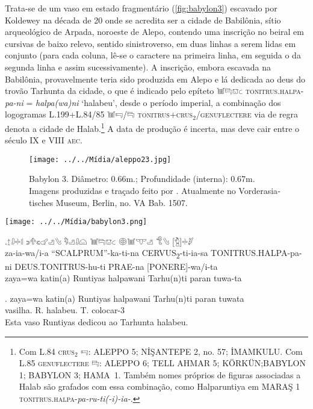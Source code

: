 Trata-se de um vaso em estado fragmentário (\autoref{fig:babylon3}) escavado por
Koldewey na década de 20 onde se acredita ser a cidade de Babilônia, sítio
arqueológico de Arpada, noroeste de Alepo, contendo uma inscrição no
beiral em cursivas de baixo relevo, sentido sinistroverso, em duas linhas a
serem lidas em conjunto (para cada coluna, lê-se o caractere na primeira linha,
em seguida o da segunda linha e assim sucessivamente).
A inscrição, embora escavada na Babilônia, provavelmente teria sido
produzida em Alepo e lá dedicada ao deus do trovão Tarhunta da cidade, o que é
indicado pelo epíteto 𔓢𔑞𔕸𔗐 \textsc{tonitrus.halpa}-\textit{pa-ni}
= \textit{halpa{(wa)}ni} `halabeu', desde o período imperial,
a combinação dos logogramas L.199+L.84\slash{}85 𔓢𔑝\slash{}𔑞
\textsc{tonitrus+crus$_2$\slash{}genuflectere} 
via de regra denota a cidade de Halab.\footnote{Com L.84
	\textsc{crus}$_2$ 𔑝: ALEPPO 5; NİŞANTEPE 2, no. 57; İMAMKULU.\@
	Com L.85 \textsc{genuflectere} 𔑞:  ALEPPO 6; TELL AHMAR 5;
	KÖRKÜN;\@ BABYLON 1; BABYLON 3; \mbox{HAMA 1}.\@
 Também nomes próprios de figuras associadas a Halab são grafados com essa
 combinação, como Halparuntiya em 
 MARAŞ 1 \textsc{tonitrus.halpa}-\textit{pa-ru-ti{(-i)}-ia-}.
}
A data de produção é incerta, mas deve cair entre o século IX e VIII
\textsc{aec}.

\begin{figure}[!htb]
	\texttt{[image: ../../Mídia/aleppo23.jpg]}
		\caption{
			Babylon 3. Diâmetro: 0.66m.; Profundidade 
			(interna): 0.67m. Imagens produzidas e traçado feito por 
			\citet[\emph{plate} 212]{CHLI13}. Atualmente no 
			\foreignlanguage{german}{Vorderasiatisches Museum}, Berlin, 
			no. VA Bab. 1507.
		}\label{fig:babylon3}
\end{figure}

	\begin{center}
		\texttt{[image: ../../Mídia/babylon3.png]}
	\end{center}
\exg.{\Large 𔖪𔓱𔗬𔗷} {\Large 𔗎𔔯𔗏𔗧𔑣𔐤} {\Large 𔑵𔑣𔓱𔗔} {\Large 𔓢𔑞𔕸𔗐} {\Large 𔖖𔓢𔕙𔑣}
{\Large 𔐎𔐤} {\Large [𔑇]𔗬𔑯}\\
za-ia-wa/i-a\hspace{10pt} ``SCALPRUM''-ka-ti-na\hspace{10pt}
CERVUS\textsubscript{2}-ti-ia-sa\hspace{10pt} TONITRUS.HALPA-pa-ni\hspace{10pt}
DEUS.TONITRUS-hu-ti\hspace{10pt} PRAE-na\hspace{10pt} [PONERE]-wa/i-ta\\
zaya=wa katin{(a)} Runtiyas halpawani Tarhu{(n)}ti paran tuwa-ta

\exg. zaya=wa katin{(a)} Runtiyas halpawani Tarhu{(n)}ti paran tuwata\\
\Det{}\Acu{} vasilha.\Neut{}\Acu{} R.\Com{}\Nom{} halabeu.\Dat{} T.\Dat{} \Prep{} colocar-3\Sg\\
Esta vaso Runtiyas dedicou ao Tarhunta halabeu.


